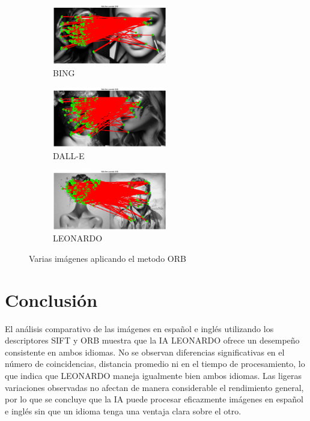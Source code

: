 \documentclass[unnumsec,webpdf,modern,large]{mam-authoring-template}
\theoremstyle{thmstyleone}%
\theoremstyle{thmstyletwo}%
\theoremstyle{thmstylethree}%
\begin{document}
\begin{figure}[htp]
    \centering
    \begin{subfigure}[]{}
        \includegraphics[width=5cm]{bing202.png}
        \caption{BING}
    \end{subfigure}
    \begin{subfigure}[]{}
        \includegraphics[width=5cm]{dall202.png}
        \caption{DALL-E}
    \end{subfigure}
    \begin{subfigure}[]{}
        \includegraphics[width=5cm]{leo202.png}
        \caption{LEONARDO}
    \end{subfigure}
    \caption{Varias imágenes aplicando el metodo ORB}
    \label{fig:varias_imagenes}
\end{figure}

\section{Conclusión}

El análisis comparativo de las imágenes en español e inglés utilizando los descriptores SIFT y ORB muestra que la IA LEONARDO ofrece un desempeño consistente en ambos idiomas. No se observan diferencias significativas en el número de coincidencias, distancia promedio ni en el tiempo de procesamiento, lo que indica que LEONARDO maneja igualmente bien ambos idiomas. Las ligeras variaciones observadas no afectan de manera considerable el rendimiento general, por lo que se concluye que la IA puede procesar eficazmente imágenes en español e inglés sin que un idioma tenga una ventaja clara sobre el otro.
\end{document}
